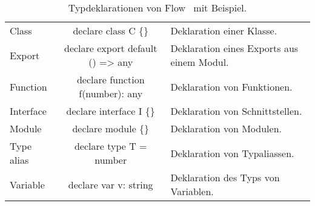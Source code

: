 \begin{table}[tbh]
  \caption{Typdeklarationen von Flow~\autocite{FLOW:LIBRARY_DEFINITIONS} mit Beispiel.}
  \footnotesize
  \begin{tabu} to 
    \midrule
     &  &  \\
    \midrule
    Class       & declare class C \{\}             & Deklaration einer Klasse. \\
    Export      & declare export default () => any & Deklaration eines Exports aus einem Modul. \\
    Function    & declare function f(number): any  & Deklaration von Funktionen. \\
    Interface   & declare interface I \{\}         & Deklaration von Schnittstellen. \\
    Module      & declare module  \{\}      & Deklaration von Modulen. \\
    Type alias  & declare type T = number          & Deklaration von Typaliassen. \\
    Variable    & declare var v: string            & Deklaration des Typs von Variablen. \\
    \midrule
  \end{tabu}
  \label{tab:flow-type-declarations}
\end{table}
